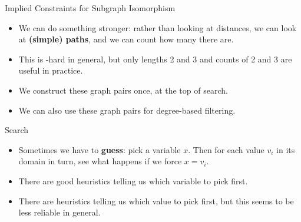 \documentclass{beamer}
\begin{document}
\begin{frame}{Implied Constraints for Subgraph Isomorphism}
{
        \vspace{1em}
    }

     {
        \begin{itemize}
            \item We can do something stronger: rather than looking at distances, we can look at
                \textbf{(simple) paths}, and we can count how many there are.

            \item This is \NP-hard in general, but only lengths 2 and 3 and counts of 2 and 3 are
                useful in practice.

            \item We construct these graph pairs once, at the top of search.

            \item We can also use these graph pairs for degree-based filtering.
        \end{itemize}
    }

\end{frame}

\begin{frame}{Search}
    \begin{itemize}
        \item Sometimes we have to \textbf{guess}: pick a variable $x$. Then for each value $v_i$ in
            its domain in turn, see what happens if we force $x = v_i$.
        \item There are good heuristics telling us which variable to pick first.
        \item There are heuristics telling us which value to pick first, but this seems to be
            less reliable in general.
    \end{itemize}
\end{frame}
\end{document}
